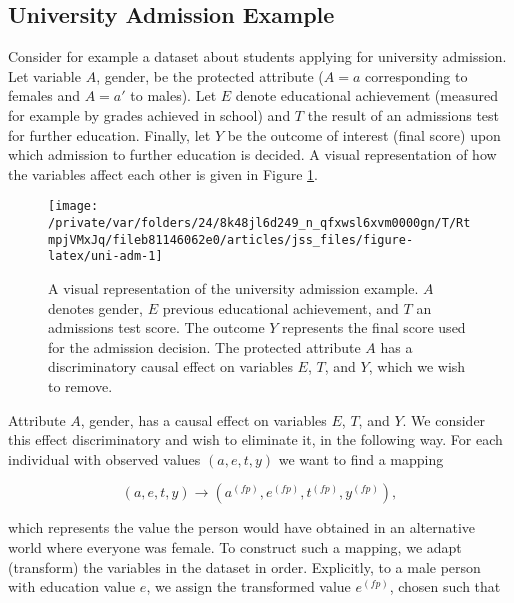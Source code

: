 \documentclass[
  nojss]{jss}
\begin{document}
\hypertarget{university-admission-example}{%
\subsection{University Admission
Example}\label{university-admission-example}}

Consider for example a dataset about students applying for university
admission. Let variable \(A\), gender, be the protected attribute
(\(A = a\) corresponding to females and \(A = a'\) to males). Let \(E\)
denote educational achievement (measured for example by grades achieved
in school) and \(T\) the result of an admissions test for further
education. Finally, let \(Y\) be the outcome of interest (final score)
upon which admission to further education is decided. A visual
representation of how the variables affect each other is given in Figure
\ref{fig:uni-adm}.

\begin{CodeChunk}
\begin{figure}

{\centering \texttt{[image: /private/var/folders/24/8k48jl6d249\_n\_qfxwsl6xvm0000gn/T/RtmpjVMxJq/fileb81146062e0/articles/jss\_files/figure-latex/uni-adm-1]} 

}

\caption[A visual representation of the university admission example]{A visual representation of the university admission example. $A$ denotes gender, $E$ previous educational achievement, and $T$ an admissions test score. The outcome $Y$ represents the final score used for the admission decision. The protected attribute $A$ has a discriminatory causal effect on variables $E$, $T$, and $Y$, which we wish to remove.}\label{fig:uni-adm}
\end{figure}
\end{CodeChunk}

Attribute \(A\), gender, has a causal effect on variables \(E\), \(T\),
and \(Y\). We consider this effect discriminatory and wish to eliminate
it, in the following way. For each individual with observed values
\((a, e, t, y)\) we want to find a mapping

\[(a, e, t, y) \longrightarrow  ( {a}^{(fp)},  {e}^{(fp)},  {t}^{(fp)},  {y}^{(fp)}),\]

which represents the value the person would have obtained in an
alternative world where everyone was female. To construct such a
mapping, we adapt (transform) the variables in the dataset in order.
Explicitly, to a male person with education value \(e\), we assign the
transformed value \( {e}^{(fp)}\), chosen such that
\end{document}
